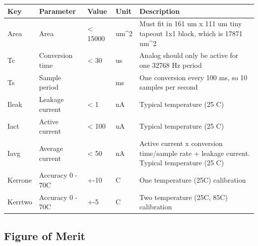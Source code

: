 \begin{longtable}[]{@{}
  >{\raggedright\arraybackslash}p{}
  >{\raggedright\arraybackslash}p{}
  >{\raggedright\arraybackslash}p{}
  >{\raggedright\arraybackslash}p{}
  >{\raggedright\arraybackslash}p{}@{}}
\toprule\noalign{}
\begin{minipage}[b]{\linewidth}\raggedright
Key
\end{minipage} & \begin{minipage}[b]{\linewidth}\raggedright
Parameter
\end{minipage} & \begin{minipage}[b]{\linewidth}\raggedright
Value
\end{minipage} & \begin{minipage}[b]{\linewidth}\raggedright
Unit
\end{minipage} & \begin{minipage}[b]{\linewidth}\raggedright
Description
\end{minipage} \\
\midrule\noalign{}
\endhead
\bottomrule\noalign{}
\endlastfoot
Area & Area & \textless{} 15000 & um\^{}2 & Must fit in 161 um x 111 um
tiny tapeout 1x1 block, which is 17871 um\^{}2 \\
Tc & Conversion time & \textless{} 30 & us & Analog should only be
active for one 32768 Hz period \\
Ts & Sample period & 100 & ms & One conversion every 100 ms, so 10
samples per second \\
Ileak & Leakage current & \textless{} 1 & nA & Typical temperature (25
C) \\
Iact & Active current & \textless{} 100 & uA & Typical temperature (25
C) \\
Iavg & Average current & \textless{} 50 & nA & Active current x
conversion time/sample rate + leakage current. Typical temperature (25
C) \\
Kerrone & Accuracy 0 - 70C & +-10 & C & One temperature (25C)
calibration \\
Kerrtwo & Accuracy 0 - 70C & +-5 & C & Two temperature (25C, 85C)
calibration \\
\end{longtable}

\subsection{Figure of Merit}\label{figure-of-merit}

